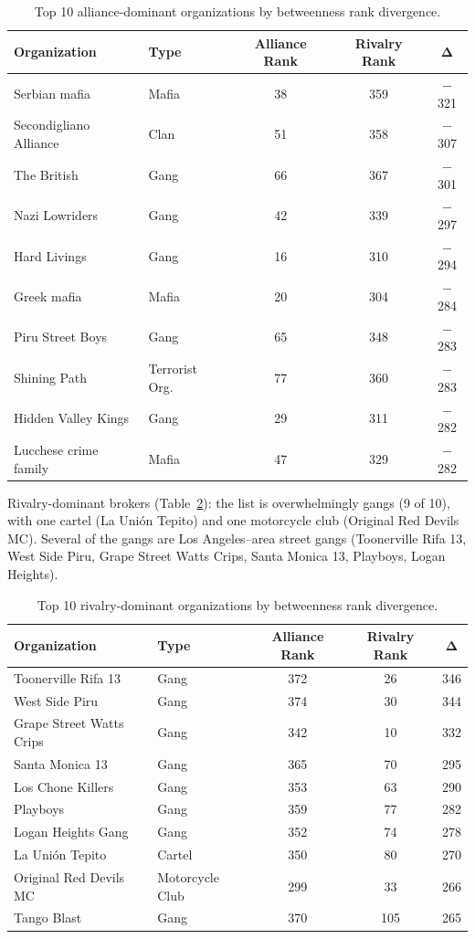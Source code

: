 \documentclass[11pt,a4paper]{article}
\begin{document}
\begin{table}[H]
\centering
\caption{Top 10 alliance-dominant organizations by betweenness rank divergence.}
\label{tab:alliance_dominant}
\small
\begin{tabular}{@{}llccc@{}}
\toprule
\textbf{Organization} & \textbf{Type} & \textbf{Alliance Rank} & \textbf{Rivalry Rank} & $\boldsymbol{\Delta}$ \\
\midrule
Serbian mafia & Mafia & 38 & 359 & $-$321 \\
Secondigliano Alliance & Clan & 51 & 358 & $-$307 \\
The British & Gang & 66 & 367 & $-$301 \\
Nazi Lowriders & Gang & 42 & 339 & $-$297 \\
Hard Livings & Gang & 16 & 310 & $-$294 \\
Greek mafia & Mafia & 20 & 304 & $-$284 \\
Piru Street Boys & Gang & 65 & 348 & $-$283 \\
Shining Path & Terrorist Org. & 77 & 360 & $-$283 \\
Hidden Valley Kings & Gang & 29 & 311 & $-$282 \\
Lucchese crime family & Mafia & 47 & 329 & $-$282 \\
\bottomrule
\end{tabular}
\end{table}

Rivalry-dominant brokers (Table~\ref{tab:rivalry_dominant}): the list is overwhelmingly gangs (9 of 10), with one cartel (La Unión Tepito) and one motorcycle club (Original Red Devils MC). Several of the gangs are Los Angeles–area street gangs (Toonerville Rifa 13, West Side Piru, Grape Street Watts Crips, Santa Monica 13, Playboys, Logan Heights). 

\begin{table}[H]
\centering
\caption{Top 10 rivalry-dominant organizations by betweenness rank divergence.}
\label{tab:rivalry_dominant}
\small
\begin{tabular}{@{}llccc@{}}
\toprule
\textbf{Organization} & \textbf{Type} & \textbf{Alliance Rank} & \textbf{Rivalry Rank} & $\boldsymbol{\Delta}$ \\
\midrule
Toonerville Rifa 13 & Gang & 372 & 26 & 346 \\
West Side Piru & Gang & 374 & 30 & 344 \\
Grape Street Watts Crips & Gang & 342 & 10 & 332 \\
Santa Monica 13 & Gang & 365 & 70 & 295 \\
Los Chone Killers & Gang & 353 & 63 & 290 \\
Playboys & Gang & 359 & 77 & 282 \\
Logan Heights Gang & Gang & 352 & 74 & 278 \\
La Unión Tepito & Cartel & 350 & 80 & 270 \\
Original Red Devils MC & Motorcycle Club & 299 & 33 & 266 \\
Tango Blast & Gang & 370 & 105 & 265 \\
\bottomrule
\end{tabular}
\end{table}
\end{document}
